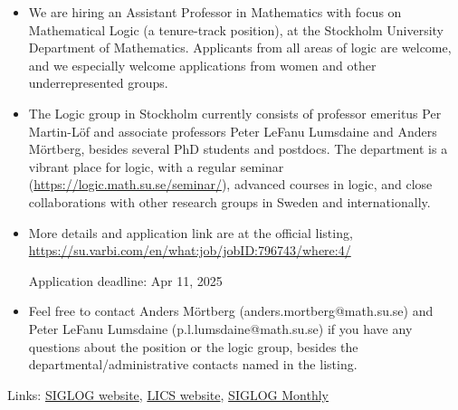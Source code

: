 \documentclass[prodmode,acmtecs]{acmsmall} %
\begin{document}
\begin{itemize}\item  We are hiring an Assistant Professor in Mathematics with focus on Mathematical Logic (a tenure-track position), at the Stockholm University Department of Mathematics. Applicants from all areas of logic are welcome, and we especially welcome applications from women and other underrepresented groups. 
 
\item  The Logic group in Stockholm currently consists of professor emeritus Per Martin-Löf and associate professors Peter LeFanu Lumsdaine and Anders Mörtberg, besides several PhD students and postdocs. The department is a vibrant place for logic, with a regular seminar (\href{https://logic.math.su.se/seminar/}{https://logic.math.su.se/seminar/}), advanced courses in logic, and close collaborations with other research groups in Sweden and internationally. 
 
\item  More details and application link are at the official listing, \href{https://su.varbi.com/en/what:job/jobID:796743/where:4/}{https://su.varbi.com/en/what:job/jobID:796743/where:4/} 
 
Application deadline: Apr 11, 2025 
 
\item  Feel free to contact Anders Mörtberg (anders.mortberg@math.su.se) and Peter LeFanu Lumsdaine (p.l.lumsdaine@math.su.se) if you have any questions about the position or the logic group, besides the departmental/administrative contacts named in the listing. 
 
\end{itemize}


\bigskip Links: \href{http://siglog.org/}{SIGLOG website}, \href{https://lics.siglog.org}{LICS website}, \href{https://lics.siglog.org/newsletters/}{SIGLOG Monthly}
\end{document}

